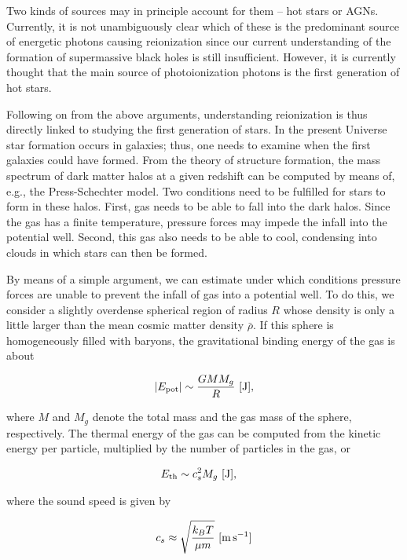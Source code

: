 \documentclass[a4paper,11pt]{article}
\begin{document}
{\noindent}Two kinds of sources may in principle account for them -- hot stars or AGNs. Currently, it is not unambiguously clear which of these is the predominant source of energetic photons causing reionization since our current understanding of the formation of supermassive black holes is still insufficient. However, it is currently thought that the main source of photoionization photons is the first generation of hot stars.

{\noindent}Following on from the above arguments, understanding reionization is thus directly linked to studying the first generation of stars. In the present Universe star formation occurs in galaxies; thus, one needs to examine when the first galaxies could have formed. From the theory of structure formation, the mass spectrum of dark matter halos at a given redshift can be computed by means of, e.g., the Press-Schechter model. Two conditions need to be fulfilled for stars to form in these halos. First, gas needs to be able to fall into the dark halos. Since the gas has a finite temperature, pressure forces may impede the infall into the potential well. Second, this gas also needs to be able to cool, condensing into clouds in which stars can then be formed.

{\noindent}By means of a simple argument, we can estimate under which conditions pressure forces are unable to prevent the infall of gas into a potential well. To do this, we consider a slightly overdense spherical region of radius $R$ whose density is only a little larger than the mean cosmic matter density $\bar{\rho}$. If this sphere is homogeneously filled with baryons, the gravitational binding energy of the gas is about

\begin{align*}
    \lvert E_\mathrm{pot} \rvert \sim \frac{GMM_g}{R} ~ [{\rm J}],
\end{align*}

{\noindent}where $M$ and $M_g$ denote the total mass and the gas mass of the sphere, respectively. The thermal energy of the gas can be computed from the kinetic energy per particle, multiplied by the number of particles in the gas, or

\begin{align*}
    E_\mathrm{th} &\sim c_s^2M_g ~ [{\rm J}],    
\end{align*}

{\noindent}where the sound speed is given by

\begin{align*}
    c_s \approx \sqrt{\frac{k_BT}{\mu m}} ~ [{\rm m\,s^{-1}}]
\end{align*}
\end{document}
